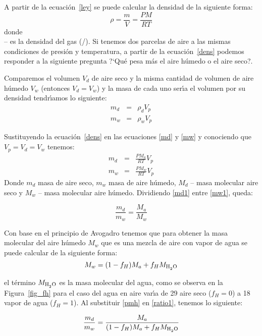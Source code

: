  A partir de la ecuaci\'on~\ref{ley} se puede calcular la densidad de la siguiente forma:
\begin{equation}
\rho=\frac{m}{V}=\frac{PM}{RT}
\label{dens}
\end{equation}
donde\\ -- es la densidad del gas (\gram/\liter).  Si tenemos dos parcelas de aire a las mismas condiciones de presi\'on y temperatura, a partir de la ecuaci\'on~\ref{dens} podemos responder a la siguiente pregunta ?`Qu\'e pesa m\'as el aire h\'umedo o el aire seco?.

Comparemos el volumen $V_d$ de aire seco y la misma cantidad de volumen de aire h\'umedo $V_w$ (entonces $V_d=V_w$) y la masa de cada uno ser\'{\i}a el volumen por su densidad tendr\'{\i}amos lo siguiente:
\begin{eqnarray}
m_d &= &\rho_d V_p \label{md}\\
 m_w & = & \rho_wV_p \label{mw}
\end{eqnarray}

Sustituyendo la ecuaci\'on~\ref{dens} en las ecuaciones \ref{md} y \ref{mw} y  conociendo que $V_p=V_d=V_w$ tenemos:
\begin{eqnarray}
m_d &= &\frac{PM_a}{RT}V_p \label{md1}\\
 m_w & = &\frac{PM_w}{RT}V_p \label{mw1} 
\end{eqnarray}
Donde $m_d$ masa de aire seco, $m_w$ masa de aire h\'umedo, $M_d$ -- masa molecular aire seco y $M_w$ -- masa molecular aire h\'umedo. Dividiendo  \ref{md1} entre  \ref{mw1}, queda:

\begin{equation}
\frac{m_d}{m_w}=\frac{M_a}{M_w} 
\label{ratio1}
\end{equation}

Con base en el principio de Avogadro tenemos que para obtener la masa molecular  del aire h\'umedo $M_w$ que es una mezcla de aire con vapor de agua se puede calcular de la siguiente forma:
\begin{equation}
M_w= (1-f_H)M_a + f_H M_{\ce{H2O}}
\label{pmh}
\end{equation}

el t\'ermino $M_{\ce{H2O}}$ es la masa molecular del agua, como se observa en la Figura~\ref{fig_fh} para el caso del agua en aire var\'{\i}a de 29 aire seco ($f_H=0$) a 18 vapor de agua ($f_H=1$). Al substituir \ref{pmh} en \ref{ratio1}, tenemos lo siguiente:


\begin{equation}
\frac{m_d}{m_w}=\frac{M_a}{(1-f_H)M_a + f_H M_{\ce{H2O}}} 
\label{ratio2}
\end{equation}

